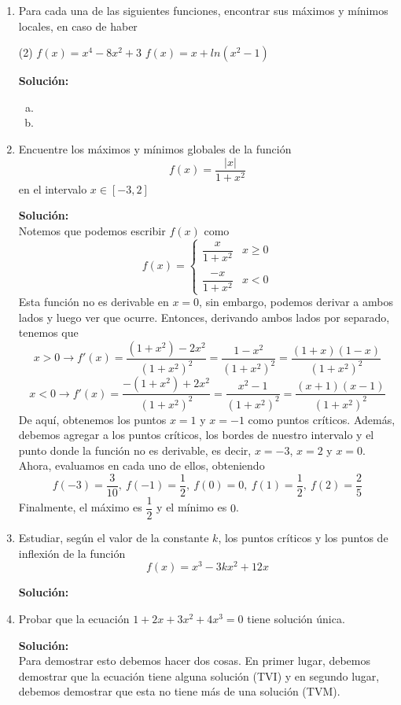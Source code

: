 \documentclass[12pt]{article}
\newenvironment{solucion}
{\begin{mdframed}[backgroundcolor=black!10]
		{\bf Solución:}\\
	}
	{
	\end{mdframed}
}
\newenvironment{preguntas}
{\begin{enumerate}\itemsep12pt
	}
	{
	\end{enumerate}
}
\newcommand{\ra}{\rightarrow}
\begin{document}
\begin{preguntas}
\item Para cada una de las siguientes funciones, encontrar sus máximos y mínimos locales, en caso de haber
\begin{tasks}(2)
\task $f(x) = x^4 - 8x^2 + 3$
\task $f(x)=x+ln(x^2-1)$
\end{tasks}
\begin{solucion}

\begin{enumerate}[a)]
\item 
\item 
\end{enumerate}
\end{solucion}
\item Encuentre los máximos y mínimos globales de la función
$$f(x) = \dfrac{|x|}{1+x^2}$$
en el intervalo $x \in [-3,2]$
\begin{solucion}
Notemos que podemos escribir $f(x)$ como
$$f(x)= \begin{cases}
\dfrac{x}{1+x^2} & x \geq 0\\\\
\dfrac{-x}{1+x^2} & x < 0
\end{cases}$$
Esta función no es derivable en $x=0$, sin embargo, podemos derivar a ambos lados y luego ver que ocurre. Entonces, derivando ambos lados por separado, tenemos que
$$x > 0 \ra f'(x) = \dfrac{(1+x^2) - 2x^2}{(1+x^2)^2} = \dfrac{1-x^2}{(1+x^2)^2} = \dfrac{(1+x)(1-x)}{(1+x^2)^2}$$
$$x < 0 \ra f'(x) = \dfrac{-(1+x^2) + 2x^2}{(1+x^2)^2} = \dfrac{x^2-1}{(1+x^2)^2} = \dfrac{(x+1)(x-1)}{(1+x^2)^2}$$
De aquí, obtenemos los puntos $x=1$ y $x=-1$ como puntos críticos. Además, debemos agregar a los puntos críticos, los bordes de nuestro intervalo y el punto donde la función no es derivable, es decir, $x=-3$, $x=2$ y $x=0$.\\

Ahora, evaluamos en cada uno de ellos, obteniendo
$$f(-3) = \dfrac{3}{10},\ f(-1) = \dfrac{1}{2}, \ f(0) = 0, \ f(1) = \dfrac{1}{2}, \ f(2) = \dfrac{2}{5}$$
Finalmente, el máximo es $\dfrac{1}{2}$ y el mínimo es $0$.
\end{solucion}
\item Estudiar, según el valor de la constante $k$, los puntos críticos y los puntos de inflexión de la función
$$f(x) = x^3-3kx^2+12x$$
\begin{solucion}

\end{solucion}
\item Probar que la ecuación $1+2x+3x^2+4x^3=0$ tiene solución única.
\begin{solucion}
Para demostrar esto debemos hacer dos cosas. En primer lugar, debemos demostrar que la ecuación tiene alguna solución (TVI) y en segundo lugar, debemos demostrar que esta no tiene más de una solución (TVM).\\


\end{solucion}
\end{preguntas}
\end{document}
